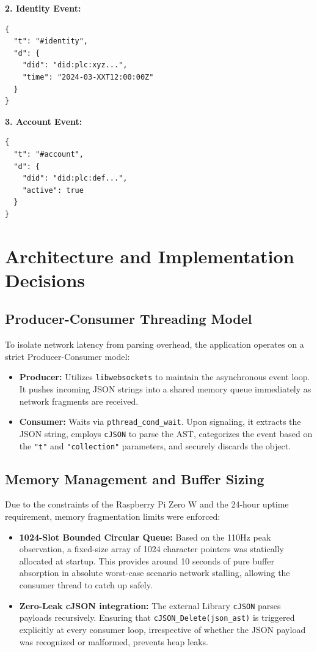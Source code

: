 \documentclass[12pt,a4paper]{article}
\begin{document}
\textbf{2. Identity Event:}
\begin{verbatim}
{
  "t": "#identity",
  "d": {
    "did": "did:plc:xyz...",
    "time": "2024-03-XXT12:00:00Z"
  }
}
\end{verbatim}

\textbf{3. Account Event:}
\begin{verbatim}
{
  "t": "#account",
  "d": {
    "did": "did:plc:def...",
    "active": true
  }
}
\end{verbatim}

\section{Architecture and Implementation Decisions}

\subsection{Producer-Consumer Threading Model}
To isolate network latency from parsing overhead, the application operates on a strict Producer-Consumer model:
\begin{itemize}
    \item \textbf{Producer:} Utilizes \texttt{libwebsockets} to maintain the asynchronous event loop. It pushes incoming JSON strings into a shared memory queue immediately as network fragments are received.
    \item \textbf{Consumer:} Waits via \texttt{pthread\_cond\_wait}. Upon signaling, it extracts the JSON string, employs \texttt{cJSON} to parse the AST, categorizes the event based on the \texttt{"t"} and \texttt{"collection"} parameters, and securely discards the object.
\end{itemize}

\subsection{Memory Management and Buffer Sizing}
Due to the constraints of the Raspberry Pi Zero W and the 24-hour uptime requirement, memory fragmentation limits were enforced:
\begin{itemize}
    \item \textbf{1024-Slot Bounded Circular Queue:} Based on the 110Hz peak observation, a fixed-size array of 1024 character pointers was statically allocated at startup. This provides around 10 seconds of pure buffer absorption in absolute worst-case scenario network stalling, allowing the consumer thread to catch up safely.
    \item \textbf{Zero-Leak cJSON integration:} The external Library \texttt{cJSON} parses payloads recursively. Ensuring that \texttt{cJSON\_Delete(json\_ast)} is triggered explicitly at every consumer loop, irrespective of whether the JSON payload was recognized or malformed, prevents heap leaks.
\end{itemize}
\end{document}
